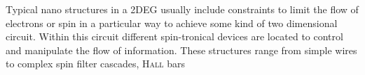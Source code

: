 Typical nano structures in a 2DEG usually include constraints to limit the flow of electrons or spin in a particular way to achieve some kind of two dimensional circuit. Within this circuit different spin-tronical devices are located to control and manipulate the flow of information. These structures range from simple wires to complex spin filter cascades, \textsc{Hall} bars 
